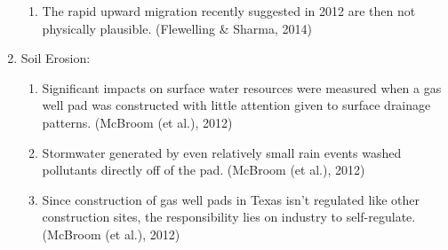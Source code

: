 \documentclass{article}
\begin{document}
\begin{enumerate}
\begin{enumerate}
          \item The rapid upward migration recently suggested in 2012 are then not physically plausible. (Flewelling \& Sharma, 2014)
        \end{enumerate}
      \item Soil Erosion:
        \begin{enumerate}
          \item Significant impacts on surface water resources were measured when a gas well pad was constructed with little attention given to surface drainage patterns. (McBroom (et al.), 2012)
          \item Stormwater generated by even relatively small rain events washed pollutants directly off of the pad. (McBroom (et al.), 2012) 
          \item Since construction of gas well pads in Texas isn't regulated like other construction sites, the responsibility lies on industry to self-regulate. (McBroom (et al.), 2012) 
        \end{enumerate} 
    \end{enumerate}
    
\end{document}
